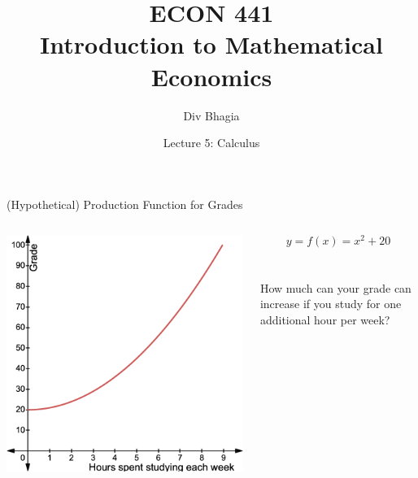 \documentclass{./../../Latex/teaching_slides}
\begin{document}
\title{ECON 441 \\ \vspace{0.4em} \normalsize Introduction to Mathematical Economics}
\author{Div Bhagia}
\date{Lecture 5: Calculus}

\begin{frame}
\maketitle
\end{frame}


\begin{frame}{\large (Hypothetical) Production Function for Grades}
\begin{columns}[c]
\begin{column}{0.55\textwidth}
\includegraphics[scale=0.225]{function.png}
\end{column}
\begin{column}{0.45\textwidth}
$$y=f(x)=x^{2}+20$$ \\~\\
How much can your grade can increase if you study for one additional hour per week? \pause {}
\end{column}
\end{columns}
\end{frame}
\end{document}
